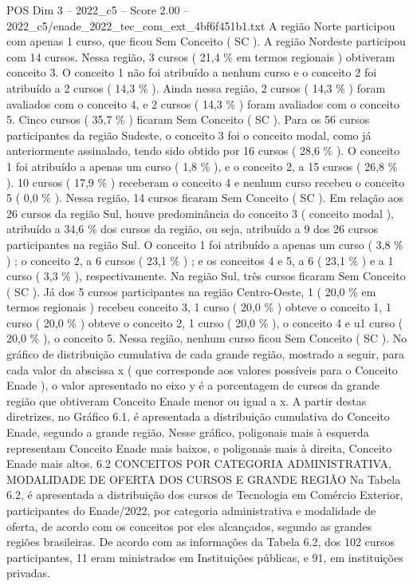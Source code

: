 \begin{textsample}{POS Dim 3 – 2022\_c5 – Score 2.00 – 2022\_c5/enade\_2022\_tec\_com\_ext\_4bf6f451b1.txt}
A região Norte participou com apenas 1 curso, que ficou Sem Conceito ( SC ).
A região Nordeste participou com 14 cursos.
Nessa região, 3 cursos ( 21,4 \% em termos regionais ) obtiveram conceito 3.
O conceito 1 não foi atribuído a nenhum curso e o conceito 2 foi atribuído a 2 cursos ( 14,3 \% ).
Ainda nessa região, 2 cursos ( 14,3 \% ) foram avaliados com o conceito 4, e 2 cursos ( 14,3 \% ) foram avaliados com o conceito 5.
Cinco cursos ( 35,7 \% ) ficaram Sem Conceito ( SC ).
Para os 56 cursos participantes da região Sudeste, o conceito 3 foi o conceito modal, como já anteriormente assinalado, tendo sido obtido por 16 cursos ( 28,6 \% ).
O conceito 1 foi atribuído a apenas um curso ( 1,8 \% ), e o conceito 2, a 15 cursos ( 26,8 \% ). 10 cursos ( 17,9 \% ) receberam o conceito 4 e nenhum curso recebeu o conceito 5 ( 0,0 \% ).
Nessa região, 14 cursos ficaram Sem Conceito ( SC ).
Em relação aos 26 cursos da região Sul, houve predominância do conceito 3 ( conceito modal ), atribuído a 34,6 \% dos cursos da região, ou seja, atribuído a 9 dos 26 cursos participantes na região Sul.
O conceito 1 foi atribuído a apenas um curso ( 3,8 \% ) ; o conceito 2, a 6 cursos ( 23,1 \% ) ; e os conceitos 4 e 5, a 6 ( 23,1 \% ) e a 1 curso ( 3,3 \% ), respectivamente.
Na região Sul, três cursos ficaram Sem Conceito ( SC ).
Já dos 5 cursos participantes na região Centro-Oeste, 1 ( 20,0 \% em termos regionais ) recebeu conceito 3, 1 curso ( 20,0 \% ) obteve o conceito 1, 1 curso ( 20,0 \% ) obteve o conceito 2, 1 curso ( 20,0 \% ), o conceito 4 e u1 curso ( 20,0 \% ), o conceito 5.
Nessa região, nenhum curso ficou Sem Conceito ( SC ).
No gráfico de distribuição cumulativa de cada grande região, mostrado a seguir, para cada valor da abscissa x ( que corresponde aos valores possíveis para o Conceito Enade ), o valor apresentado no eixo y é a porcentagem de cursos da grande região que obtiveram Conceito Enade menor ou igual a x.
A partir destas diretrizes, no Gráfico 6.1, é apresentada a distribuição cumulativa do Conceito Enade, segundo a grande região.
Nesse gráfico, poligonais mais à esquerda representam Conceito Enade mais baixos, e poligonais mais à direita, Conceito Enade mais altos. 6.2 CONCEITOS POR CATEGORIA ADMINISTRATIVA, MODALIDADE DE OFERTA DOS CURSOS E GRANDE REGIÃO Na Tabela 6.2, é apresentada a distribuição dos cursos de Tecnologia em Comércio Exterior, participantes do Enade/2022, por categoria administrativa e modalidade de oferta, de acordo com os conceitos por eles alcançados, segundo as grandes regiões brasileiras.
De acordo com as informações da Tabela 6.2, dos 102 cursos participantes, 11 eram ministrados em Instituições públicas, e 91, em instituições privadas.

\end{textsample}
